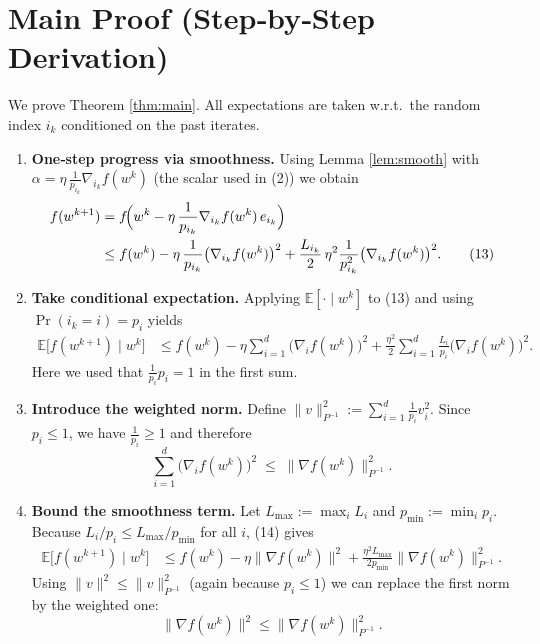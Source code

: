 \documentclass{article}
\begin{document}
\section*{Main Proof (Step‑by‑Step Derivation)}
We prove Theorem \ref{thm:main}.  
All expectations are taken w.r.t.\ the random index $i_k$ conditioned on the past iterates.

\begin{enumerate}[label=[Step \arabic*]]
\item \textbf{One‑step progress via smoothness.}  
Using Lemma \ref{lem:smooth} with $\alpha=\eta\,\frac{1}{p_{i_k}}\nabla_{i_k}f(w^{k})$ (the scalar used in (2)) we obtain
\begin{align}
f(w^{k+1})
&=f\!\Bigl(w^{k}-\eta\,\frac{1}{p_{i_k}}\nabla_{i_k}f(w^{k})\,e_{i_k}\Bigr) \nonumber\\
&\le f(w^{k})-\eta\,\frac{1}{p_{i_k}}\bigl(\nabla_{i_k}f(w^{k})\bigr)^{2}
      +\frac{L_{i_k}}{2}\,\eta^{2}\frac{1}{p_{i_k}^{2}}\bigl(\nabla_{i_k}f(w^{k})\bigr)^{2}. \tag{13}
\end{align}

\item \textbf{Take conditional expectation.}  
Applying $\mathbb{E}[\cdot\mid w^{k}]$ to (13) and using $\Pr(i_k=i)=p_i$ yields
\begin{align}
\mathbb{E}\!\bigl[f(w^{k+1})\mid w^{k}\bigr]
&\le f(w^{k})-\eta\sum_{i=1}^{d}\bigl(\nabla_i f(w^{k})\bigr)^{2}
   +\frac{\eta^{2}}{2}\sum_{i=1}^{d}\frac{L_i}{p_i}\bigl(\nabla_i f(w^{k})\bigr)^{2}. \tag{14}
\end{align}
Here we used that $\frac{1}{p_i}p_i=1$ in the first sum.

\item \textbf{Introduce the weighted norm.}  
Define $\|v\|_{P^{-1}}^{2}:=\sum_{i=1}^{d}\frac{1}{p_i}v_i^{2}$.  
Since $p_i\le 1$, we have $\frac{1}{p_i}\ge 1$ and therefore
\[
\sum_{i=1}^{d}\bigl(\nabla_i f(w^{k})\bigr)^{2}
\;\le\;
\| \nabla f(w^{k})\|_{P^{-1}}^{2}.
\tag{15}
\]

\item \textbf{Bound the smoothness term.}  
Let $L_{\max}:=\max_{i}L_i$ and $p_{\min}:=\min_{i}p_i$.  
Because $L_i/p_i\le L_{\max}/p_{\min}$ for all $i$, (14) gives
\begin{align}
\mathbb{E}\!\bigl[f(w^{k+1})\mid w^{k}\bigr]
&\le f(w^{k})-\eta\bigl\|\nabla f(w^{k})\bigr\|^{2}
   +\frac{\eta^{2}L_{\max}}{2p_{\min}}\bigl\|\nabla f(w^{k})\bigr\|_{P^{-1}}^{2}. \tag{16}
\end{align}
Using $\|v\|^{2}\le \|v\|_{P^{-1}}^{2}$ (again because $p_i\le1$) we can replace the first norm by the weighted one:
\[
\bigl\|\nabla f(w^{k})\bigr\|^{2}\le\bigl\|\nabla f(w^{k})\bigr\|_{P^{-1}}^{2}.
\tag{17}
\]


\end{enumerate}
\end{document}
